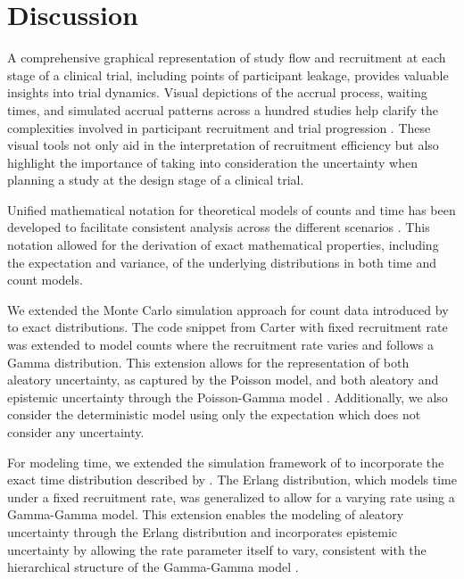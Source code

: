 

\chapter{Discussion}

A comprehensive graphical representation of study flow and recruitment at each stage of a clinical trial, including points of participant leakage, provides valuable insights into trial dynamics. Visual depictions of the accrual process, waiting times, and simulated accrual patterns across a hundred studies help clarify the complexities involved in participant recruitment and trial progression \citep{spiegelhalter2011visualizing}. These visual tools not only aid in the interpretation of recruitment efficiency but also highlight the importance of taking into consideration the uncertainty when planning a study at the design stage of a clinical trial.

Unified mathematical notation for theoretical models of counts and time has been developed to facilitate consistent analysis across the different scenarios \citep{anisimov2007modelling}. This notation allowed for the derivation of exact mathematical properties, including the expectation and variance, of the underlying distributions in both time and count models.

We extended the Monte Carlo simulation approach for count data introduced by \cite{carter2004application} to exact distributions. The code snippet from Carter with fixed recruitment rate was extended to model counts where the recruitment rate varies and follows a Gamma distribution. This extension allows for the representation of both aleatory uncertainty, as captured by the Poisson model, and both aleatory and epistemic uncertainty through the Poisson-Gamma model \citep{ohagan2006}. Additionally, we also consider the deterministic model using only the expectation which does not consider any uncertainty. 


For modeling time, we extended the simulation framework of \cite{carter2004application} to incorporate the exact time distribution described by \cite{bagiella2001predicting}. The Erlang distribution, which models time under a fixed recruitment rate, was generalized to allow for a varying rate using a Gamma-Gamma model. This extension enables the modeling of aleatory uncertainty through the Erlang distribution and incorporates epistemic uncertainty by allowing the rate parameter itself to vary, consistent with the hierarchical structure of the Gamma-Gamma model \citep{ohagan2006}.


